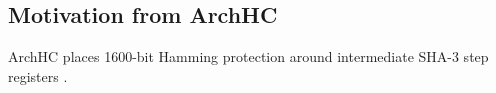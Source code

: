 \subsection{Motivation from ArchHC}
ArchHC places 1600-bit Hamming protection around intermediate SHA-3 step registers \cite{archhc2022}.

